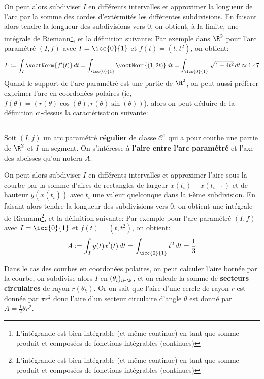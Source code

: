 On peut alors subdiviser \(I\) en différents intervalles et approximer la longueur de l'arc par la somme des cordes d'extérmités les différentes subdivisions. En faisant alors tendre la longueur des subdivisions vers 0, on obtient, à la limite, une intégrale de Riemann\footnote[1]{L'intégrande est bien intégrable (et même continue) en tant que somme produit et composées de fonctions intégrables (continues)}, et la définition suivante:
Par exemple dans \(\R^2\) pour l'arc paramétré \((I, f)\) avec \(I = \icc{0}{1}\) et \(f(t) = (t, t^2)\), on obtient:
\[
   L := \int_{I} \vectNorm{f'(t)}\,dt = \int_{\icc{0}{1}} \vectNorm{(1, 2t)}\,dt = \int_{\icc{0}{1}}\sqrt{1 + 4t^2}\,dt \approx 1.47
\]
Quand le support de l'arc paramétré est une partie de \(\R^2\), on peut aussi préfèrer exprimer l'arc en coordonées polaires (ie, \(f(\theta)=(r(\theta)\cos(\theta),r(\theta)\sin(\theta))\)), alors on peut déduire de la définition ci-dessus la caractérisation suivante:

\subsection*{}
Soit \((I, f)\) un arc paramétré \textbf{régulier} de classe \(\mathcal{C}^1\) qui a pour courbe une partie de \(\R^2\) et \(I\) un segment. On s'intéresse à \textbf{l'aire entre l'arc paramétré} et l'axe des abcisses qu'on notera \(A\).
\pagebreak

On peut alors subdiviser \(I\) en différents intervalles et approximer l'aire sous la courbe par la somme d'aires de rectangles de largeur \(x(t_i)-x(t_{i-1})\) et de hauteur \(y(x(\overline{t}_i))\) avec \(\overline{t}_i\) une valeur quelconque dans la i-ème subdivision. En faisant alors tendre la longueur des subdivisions vers 0, on obtient une intégrale de Riemann\footnote[1]{\label{note1}L'intégrande est bien intégrable (et même continue) en tant que somme produit et composées de fonctions intégrables (continues)}, et la définition suivante:
Par exemple pour l'arc paramétré \((I, f)\) avec \(I = \icc{0}{1}\) et \(f(t) = (t, t^2)\), on obtient:
\[
   A := \int_I y(t)x'(t)\, dt = \int_{\icc{0}{1}} t^2\, dt = \frac{1}{3}
\]

Dans le cas des courbes en coordonées polaires, on peut calculer l'aire bornée par la courbe, on subdivise alors \(I\) en \((\theta_i)_{i \in \N}\), et on calcule la somme de \textbf{secteurs circulaires} de rayon \(r(\theta_k)\). Or on sait que l'aire d'une cercle de rayon \(r\) est donnée par \(\pi r^2\) donc l'aire d'un secteur circulaire d'angle \(\theta\) est donné par \(A = \frac{1}{2}\theta r^2\).\<

